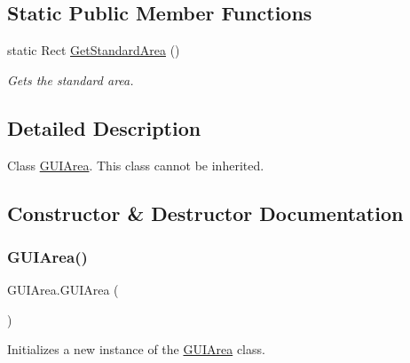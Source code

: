 \subsection*{Static Public Member Functions}
\begin{DoxyCompactItemize}
\item 
static Rect \hyperlink{class_g_u_i_area_a0bcc0000d655b0b70cea49c88a843729}{Get\+Standard\+Area} ()
\begin{DoxyCompactList}\small\item\em Gets the standard area. \end{DoxyCompactList}\end{DoxyCompactItemize}


\subsection{Detailed Description}
Class \hyperlink{class_g_u_i_area}{G\+U\+I\+Area}. This class cannot be inherited. 



\subsection{Constructor \& Destructor Documentation}
\mbox{\label{class_g_u_i_area_a05cd884c7434979172adffe1b00b1b00}} 
\subsubsection{\texorpdfstring{G\+U\+I\+Area()}{GUIArea()}\hspace{0.1cm}{\footnotesize\ttfamily [1/2]}}
{\footnotesize\ttfamily G\+U\+I\+Area.\+G\+U\+I\+Area (\begin{DoxyParamCaption}{ }\end{DoxyParamCaption})\hspace{0.3cm}{\ttfamily [inline]}}



Initializes a new instance of the \hyperlink{class_g_u_i_area}{G\+U\+I\+Area} class. 

\mbox{\label{class_g_u_i_area_a1c687ef38e01337aa39c0b72d86e62eb}} 
